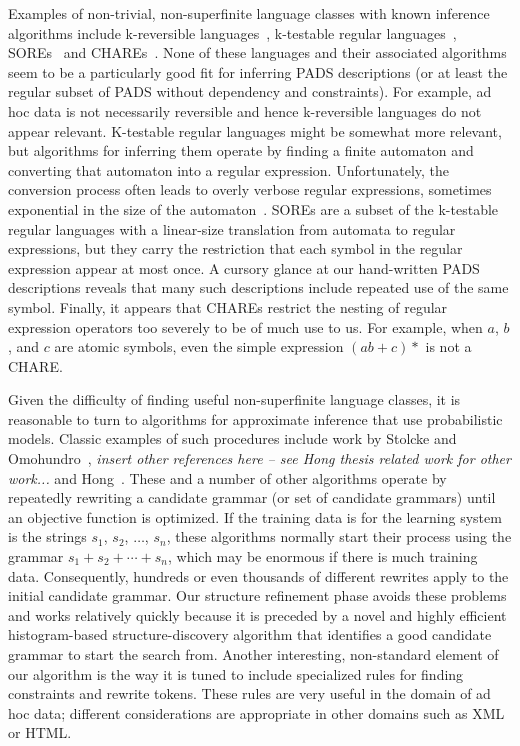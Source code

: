 Examples of non-trivial, non-superfinite
language classes with known inference algorithms include
k-reversible languages~\cite{angluin:revesible-language-inference},
k-testable regular languages~\cite{garcia+:k-testable-languages},
SOREs~\cite{bex+:dtd-inference} and CHAREs~\cite{bex+:dtd-inference}.
None of these languages and their associated algorithms seem to be 
a particularly good fit for inferring PADS descriptions (or at least the
regular subset of PADS without dependency and constraints).  
For example, ad hoc data
is not necessarily reversible and hence k-reversible languages
do not appear relevant.  K-testable regular languages might be somewhat
more relevant, but algorithms for inferring them
operate by finding a finite automaton and converting that 
automaton into a regular expression.  Unfortunately, the conversion process
often leads to overly verbose regular expressions, sometimes 
exponential in the size of the automaton~\cite{bex+:dtd-inference}. 
SOREs are a subset of the k-testable
regular languages with a linear-size translation from automata to
regular expressions, but they carry the restriction that each symbol
in the regular expression appear at most once.  A cursory glance at
our hand-written PADS descriptions reveals that many such descriptions
include repeated use of the same symbol.  Finally, it appears that
CHAREs restrict the nesting of regular expression operators too severely to 
be of much use to us.  For example, when $a$, $b$, and $c$ are atomic symbols,
even the simple expression $(ab + c)*$ is not a CHARE.

Given the difficulty of finding useful non-superfinite language classes,
it is reasonable to turn to algorithms for approximate
inference that use probabilistic models.    
Classic examples of such procedures include work by Stolcke and
Omohundro~\cite{stolcke94inducing}, {\em insert other references here -- see Hong thesis related work for other work...} and 
Hong~\cite{hong01using,hong:thesis}.  These and a number of other algorithms
operate by repeatedly rewriting a candidate grammar (or set of candidate
grammars) until an objective function is optimized.
If the training data is for the learning system is the strings
$s_1$, $s_2$, $\ldots$, $s_n$, these algorithms normally start their
process using the grammar $s_1 + s_2 + \cdots + s_n$, which may
be enormous if there is much training data.  
Consequently, hundreds or even thousands of different rewrites apply to the
initial candidate grammar.  Our structure refinement
phase avoids these problems and works relatively quickly 
because it is preceded by a novel and highly efficient
histogram-based structure-discovery algorithm 
that identifies a good candidate grammar to start the search from.  
Another interesting, non-standard element of our algorithm is the way 
it is tuned to include specialized rules for finding constraints and 
rewrite tokens.
These rules are very useful in the domain of ad hoc data; different
considerations are appropriate in other domains such as XML or HTML.

